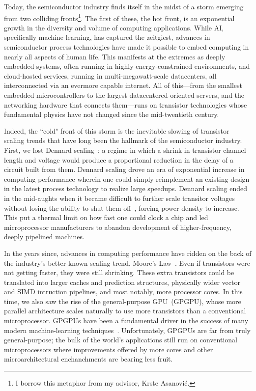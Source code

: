 Today, the semiconductor industry finds itself in the midst of a storm emerging
from two colliding fronts\footnote{I borrow this metaphor from my advisor,
Krste Asanovi\'c.}. The first
of these, the hot front, is an exponential growth in the diversity and volume
of computing applications.  While AI, specifically machine
learning, has captured the zeitgiest, advances in semiconductor process
technologies have made it possible to embed computing in nearly all aspects of
human life. This manifests at the extremes as deeply embedded systems, often running in highly
energy-constrained environments, and cloud-hosted services, running in
multi-megawatt-scale datacenters, all interconnected via an evermore capable internet.  All of
this---from the smallest embedded microcontrollers to the largest
datacentered-oriented servers, and the networking hardware that connects
them---runs on transistor technologies whose fundamental physics have not
changed since the mid-twentieth century.

Indeed, the ``cold" front of this storm is the inevitable slowing of transistor
scaling trends that have long been the hallmark of the semiconductor industry.
First, we lost Dennard scaling~\cite{DennardScaling}: a regime in which a
shrink in transistor channel length and voltage would produce a proportional
reduction in the delay of a circuit built from them.  Dennard scaling drove an
era of exponential increase in computing performance wherein one could simply
reimplement an existing design in the latest process technology to realize
large speedups. Dennard scaling ended in the mid-aughts when it became
difficult to further  scale transitor voltages without losing the ability to
shut them off~\cite{ScalingChallenges}, forcing power density to increase. This
put a thermal limit on how fast one could clock a chip and led microprocessor
manufacturers to abandon development of higher-frequency, deeply pipelined
machines.

In the years since, advances in computing performance have ridden on the back
of the industry's better-known scaling trend, Moore's Law~\cite{MooresLaw}. Even if
transistors were not getting faster, they were still shrinking. These extra
transistors could be translated into larger caches and prediction structures,
physically wider vector and SIMD intruction pipelines, and most notably, more
processor cores. In this time, we also saw the rise of the general-purpose
GPU~(GPGPU), whose more parallel architecture scales naturally to use more
transistors than a conventional microprocessor. GPGPUs have been
a fundamental driver in the success of many modern machine-learning
techniques~\cite{AlexNet}.  Unfortunately, GPGPUs are far from truly
general-purpose; the bulk of the world's applications still run on conventional
microprocessors where improvements offered by more cores and other
microarchitectural enchanchments are bearing less fruit.


